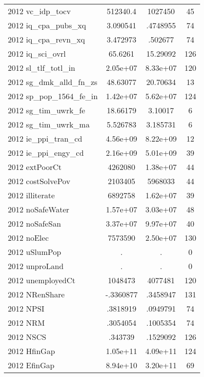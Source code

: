 {\begin{tabular}{l*{1}{ccc}}
2012 vc\_idp\_tocv    &    512340.4&     1027450&          45\\
2012 iq\_cpa\_pubs\_xq &    3.090541&    .4748955&          74\\
2012 iq\_cpa\_revn\_xq &    3.472973&     .502677&          74\\
2012 iq\_sci\_ovrl    &     65.6261&    15.29092&         126\\
2012 sl\_tlf\_totl\_in &    2.05e+07&    8.33e+07&         120\\
2012 sg\_dmk\_alld\_fn\_zs&    48.63077&    20.70634&          13\\
2012 sp\_pop\_1564\_fe\_in&    1.42e+07&    5.62e+07&         124\\
2012 sg\_tim\_uwrk\_fe &    18.66179&     3.10017&           6\\
2012 sg\_tim\_uwrk\_ma &    5.526783&    3.185731&           6\\
2012 ie\_ppi\_tran\_cd &    4.56e+09&    8.22e+09&          12\\
2012 ie\_ppi\_engy\_cd &    2.16e+09&    5.01e+09&          39\\
2012 extPoorCt      &     4262080&    1.38e+07&          44\\
2012 costSolvePov   &     2103405&     5968033&          44\\
2012 illiterate     &     6892758&    1.62e+07&          39\\
2012 noSafeWater    &    1.57e+07&    3.03e+07&          48\\
2012 noSafeSan      &    3.37e+07&    9.97e+07&          40\\
2012 noElec         &     7573590&    2.50e+07&         130\\
2012 uSlumPop       &           .&           .&           0\\
2012 unproLand      &           .&           .&           0\\
2012 unemployedCt   &     1048473&     4077481&         120\\
2012 NRenShare      &   -.3360877&    .3458947&         131\\
2012 NPSI           &    .3818919&    .0949791&          74\\
2012 NRM            &    .3054054&    .1005354&          74\\
2012 NSCS           &     .343739&    .1529092&         126\\
2012 HfinGap        &    1.05e+11&    4.09e+11&         124\\
2012 EfinGap        &    8.94e+10&    3.20e+11&          69\\

\end{tabular}}
